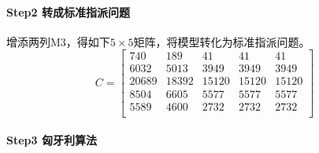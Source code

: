 \documentclass[withoutpreface]{cumcmthesis}
\begin{document}
\paragraph{Step2 转成标准指派问题}
增添两列M3，得如下$5\times 5$矩阵，将模型转化为标准指派问题。
\[
C = \begin{bmatrix}
740 & 189 & 41 & 41 & 41 \\
6032 & 5013 & 3949 & 3949 & 3949 \\
20689 & 18392 & 15120 & 15120 & 15120 \\
8504 & 6605 & 5577 & 5577 & 5577 \\
5589 & 4600 & 2732 & 2732 & 2732 \\
\end{bmatrix}
\]

\paragraph{Step3 匈牙利算法}
\end{document}
